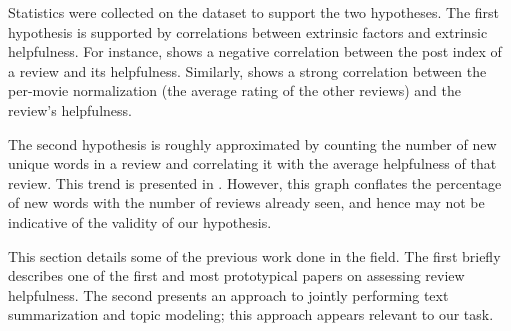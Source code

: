 \documentclass[letter,12pt]{article}
\begin{document}
Statistics were collected on the dataset to support the two hypotheses.
The first hypothesis is supported by correlations between extrinsic
	factors and extrinsic helpfulness.
For instance,  shows a negative correlation between the
	post index of a review and its helpfulness.
Similarly,  shows a strong correlation between the
	per-movie normalization (the average rating of the other reviews)
	and the review's helpfulness.



The second hypothesis is roughly approximated by counting the number of
	new unique words in a review and correlating it with the average helpfulness
	of that review.
This trend is presented in .
However, this graph conflates the percentage of new words with the number of
	reviews already seen, and hence may not be indicative of the validity
	of our hypothesis.




This section details some of the previous work done in the field.
The first briefly describes one of the first and most prototypical papers
	on assessing review helpfulness.
The second presents an approach to jointly performing text summarization
	and topic modeling; this approach appears relevant to our task.
\end{document}
